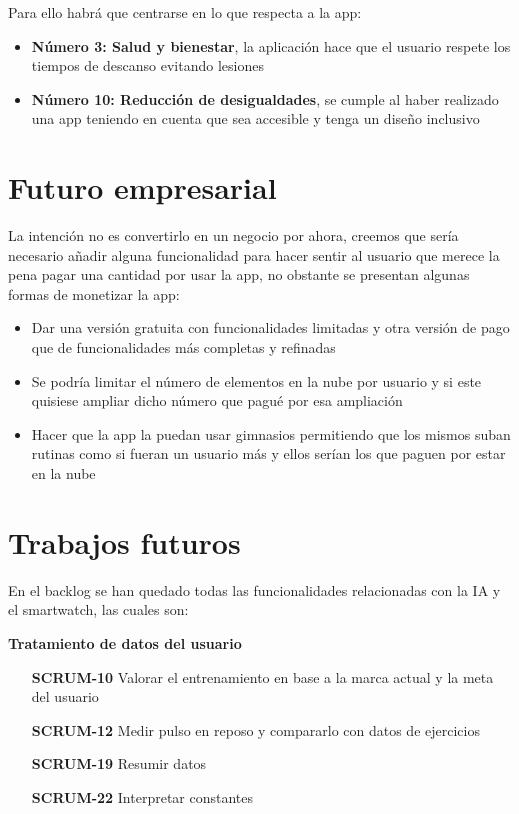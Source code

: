 Para ello habrá que centrarse en lo que respecta a la app:
\begin{itemize}
	\item \textbf{Número 3: Salud y bienestar}, la aplicación hace que el usuario respete los tiempos de descanso evitando lesiones
	\item \textbf{Número 10: Reducción de desigualdades}, se cumple al haber realizado una app teniendo en cuenta que sea accesible y tenga un diseño inclusivo
\end{itemize}

\section{Futuro empresarial}

La intención no es convertirlo en un negocio por ahora, creemos que sería necesario añadir alguna funcionalidad para hacer sentir al usuario que merece la pena pagar una cantidad por usar la app, no obstante se presentan algunas formas de monetizar la app:

\begin{itemize}
	\item Dar una versión gratuita con funcionalidades limitadas y otra versión de pago que de funcionalidades más completas y refinadas
	\item Se podría limitar el número de elementos en la nube por usuario y si este quisiese ampliar dicho número que pagué por esa ampliación 
	\item Hacer que la app la puedan usar gimnasios permitiendo que los mismos suban rutinas como si fueran un usuario más y ellos serían los que paguen por estar en la nube
\end{itemize}

\section{Trabajos futuros}

En el backlog se han quedado todas las funcionalidades relacionadas con la IA y el smartwatch, las cuales son:

\hspace{0.5cm}

\textbf{Tratamiento de datos del usuario}
\begin{itemize}
		\item[\textbf{SCRUM-10}] Valorar el entrenamiento en base a la marca actual y la meta del usuario
		\item[\textbf{SCRUM-12}] Medir pulso en reposo y compararlo con datos de ejercicios
		\item[\textbf{SCRUM-19}] Resumir datos
		\item[\textbf{SCRUM-22}] Interpretar constantes
\end{itemize}

